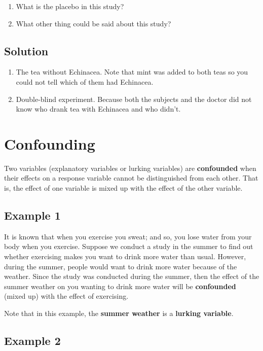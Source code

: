 \begin{enumerate}
    \item What is the placebo in this study?
    \item What other thing could be said about this study?
\end{enumerate}

\subsection*{Solution}

\begin{enumerate}
    \item The tea without Echinacea. Note that mint was added to both teas so you could not tell which of them had Echinacea.
    \item Double-blind experiment. Because both the subjects and the doctor did not know who drank tea with Echinacea and who didn't.
\end{enumerate}

\section{Confounding}

Two variables (explanatory variables or lurking variables) are \textbf{confounded} when their effects on a response variable cannot be distinguished from each other. That is, the effect of one variable is mixed up with the effect of the other variable.

\subsection*{Example 1}

It is known that when you exercise you sweat; and so, you lose water from your body when you exercise. Suppose we conduct a study in the summer to find out whether exercising makes you want to drink more water than usual. However, during the summer, people would want to drink more water because of the weather. Since the study was conducted during the summer, then the effect of the summer weather on you wanting to drink more water will be \textbf{confounded} (mixed up) with the effect of exercising.

Note that in this example, the \textbf{summer weather} is a \textbf{lurking variable}.

\subsection*{Example 2}

